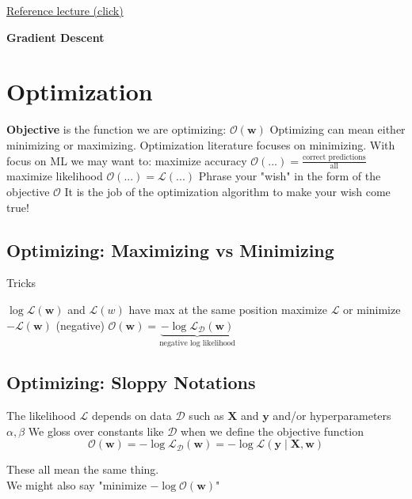 \documentclass{article}
\renewcommand{\vec}[1]{%
	\mathbf{#1}%
}
\begin{document}
	\href{https://mycourses.unh.edu/courses/152824/files/folder/lecture?preview=15941715}{\textsf{Reference lecture (click)}}\\
	\begin{center}
		{\huge\bf Gradient Descent}
	\end{center}
	\section{Optimization}
	\begin{outline}
		\1 \textbf{Objective} is the function we are optimizing: $\mathcal{O}(\vec{w})$
		\1 Optimizing can mean either minimizing or maximizing. Optimization literature focuses on minimizing. With focus on ML we may want to:
		\2 maximize accuracy $\mathcal{O}(...) = \frac{\text{correct predictions}}{\text{all}}$
		\2 maximize likelihood $\mathcal{O}(...) = \mathcal{L}(...)$
		\1 Phrase your "wish" in the form of the objective $\mathcal{O}$
		\1 It is the job of the optimization algorithm to make your wish come true!
	\end{outline}
	\subsection{Optimizing: Maximizing vs Minimizing}
	Tricks
	\begin{outline}
		\1 $\log \mathcal{L}(\vec{w})$ and $\mathcal{L}(w)$ have max at the same position
		\1 maximize $\mathcal{L}$ or minimize $-\mathcal{L}(\vec{w})$ (negative)
		\1 $\mathcal{O}(\vec{w}) = \underbrace{-\log \mathcal{L}_{\mathcal{D}}(\vec{w})}_{\text{negative log likelihood}}$
	\end{outline}
	\subsection{Optimizing: Sloppy Notations}
	\begin{outline}
		\1 The likelihood $\mathcal{L}$ depends on data $\mathcal{D}$ such as $\vec{X}$ and $\vec{y}$ and/or hyperparameters $\alpha, \beta$
		\1 We gloss over constants like $\mathcal{D}$ when we define the objective function
		\[ \mathcal{O}(\vec{w}) = -\log\mathcal{L}_{\mathcal{D}}(\vec{w}) = -\log \mathcal{L}(\vec{y} \;|\; \vec{X}, \vec{w}) \]
	\end{outline}
	These all mean the same thing.\\
	We might also say "minimize $-\log \mathcal{O}(\vec{w})$"
\end{document}
